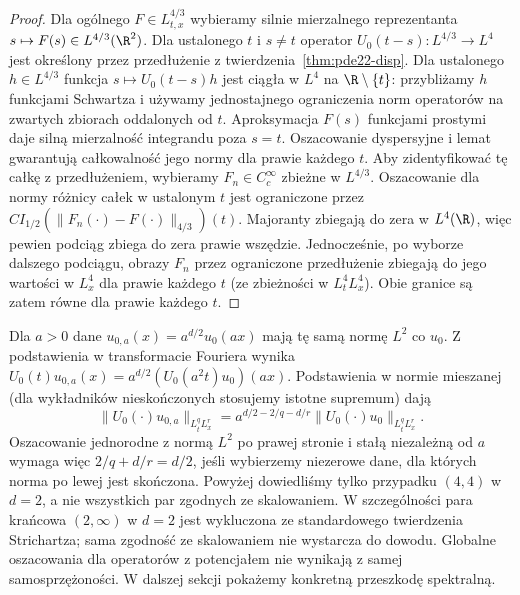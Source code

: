\begin{proof}
Dla ogólnego $F\in L^{4/3}_{t,x}$ wybieramy
silnie mierzalnego reprezentanta
$s\mapsto F(s)\in L^{4/3}(\R^2)$.
Dla ustalonego $t$ i $s\ne t$ operator
$U_0(t-s):L^{4/3}\to L^4$ jest określony
przez przedłużenie z twierdzenia~\ref{thm:pde22-disp}.
Dla ustalonego $h\in L^{4/3}$ funkcja
$s\mapsto U_0(t-s)h$ jest ciągła w $L^4$
na $\R\setminus\{t\}$: przybliżamy $h$ funkcjami
Schwartza i używamy jednostajnego ograniczenia
norm operatorów na zwartych zbiorach oddalonych
od $t$. Aproksymacja $F(s)$ funkcjami prostymi
daje silną mierzalność integrandu poza $s=t$.
Oszacowanie dyspersyjne i lemat gwarantują
całkowalność jego normy dla prawie każdego $t$.
Aby zidentyfikować tę całkę z przedłużeniem,
wybieramy $F_n\in C_c^\infty$ zbieżne w $L^{4/3}$.
Oszacowanie dla normy różnicy całek w ustalonym $t$
jest ograniczone przez
$C I_{1/2}(\|F_n(\cdot)-F(\cdot)\|_{4/3})(t)$.
Majoranty zbiegają do zera w $L^4(\R)$, więc
pewien podciąg zbiega do zera prawie wszędzie.
Jednocześnie, po wyborze dalszego podciągu,
obrazy $F_n$ przez ograniczone przedłużenie
zbiegają do jego wartości w $L^4_x$ dla prawie
każdego $t$ (ze zbieżności w $L^4_tL^4_x$).
Obie granice są zatem równe dla prawie każdego $t$.
\end{proof}

\begin{uwaga}
Dla $a>0$ dane $u_{0,a}(x)=a^{d/2}u_0(ax)$
mają tę samą normę $L^2$ co $u_0$.
Z podstawienia w transformacie Fouriera wynika
$U_0(t)u_{0,a}(x)=a^{d/2}(U_0(a^2t)u_0)(ax)$.
Podstawienia w normie mieszanej (dla wykładników
nieskończonych stosujemy istotne supremum) dają
\[
 \|U_0(\cdot)u_{0,a}\|_{L^q_tL^r_x}
 =a^{d/2-2/q-d/r}\|U_0(\cdot)u_0\|_{L^q_tL^r_x}.
\]
Oszacowanie jednorodne z normą $L^2$ po prawej
stronie i stałą niezależną od $a$ wymaga więc
$2/q+d/r=d/2$, jeśli wybierzemy niezerowe dane,
dla których norma po lewej jest skończona.
Powyżej dowiedliśmy tylko przypadku $(4,4)$
w $d=2$, a nie wszystkich par zgodnych
ze skalowaniem. W szczególności para krańcowa
$(2,\infty)$ w $d=2$ jest wykluczona ze
standardowego twierdzenia Strichartza; sama
zgodność ze skalowaniem nie wystarcza do dowodu.
Globalne oszacowania dla operatorów z potencjałem
nie wynikają z samej samosprzężoności. W dalszej
sekcji pokażemy konkretną przeszkodę spektralną.
\end{uwaga}

